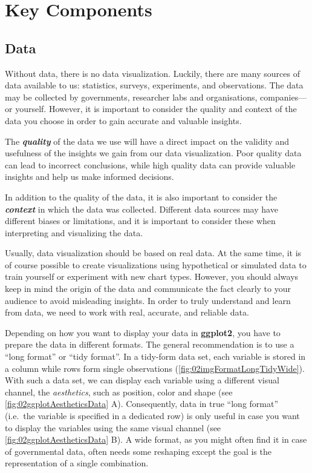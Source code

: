 \documentclass[
]{krantz}
\begin{document}
\hypertarget{key-components}{%
\section{Key Components}\label{key-components}}

\hypertarget{data}{%
\subsection{Data}\label{data}}

Without data, there is no data visualization. Luckily, there are many sources of data available to us: statistics, surveys, experiments, and observations. The data may be collected by governments, researcher labs and organisations, companies---or yourself. However, it is important to consider the quality and context of the data you choose in order to gain accurate and valuable insights.

The \textbf{\emph{quality}} of the data we use will have a direct impact on the validity and usefulness of the insights we gain from our data visualization. Poor quality data can lead to incorrect conclusions, while high quality data can provide valuable insights and help us make informed decisions.

In addition to the quality of the data, it is also important to consider the \textbf{\emph{context}} in which the data was collected. Different data sources may have different biases or limitations, and it is important to consider these when interpreting and visualizing the data.

Usually, data visualization should be based on real data. At the same time, it is of course possible to create visualizations using hypothetical or simulated data to train yourself or experiment with new chart types. However, you should always keep in mind the origin of the data and communicate the fact clearly to your audience to avoid misleading insights. In order to truly understand and learn from data, we need to work with real, accurate, and reliable data.

Depending on how you want to display your data in \textbf{ggplot2}, you have to prepare the data in different formats. The general recommendation is to use a ``long format'' or ``tidy format''. In a tidy-form data set, each variable is stored in a column while rows form single observations (\ref{fig:02imgFormatLongTidyWide}). With such a data set, we can display each variable using a different visual channel, the \emph{aesthetics}, such as position, color and shape (see \ref{fig:02ggplotAestheticsData} A). Consequently, data in true ``long format'' (i.e.~the variable is specified in a dedicated row) is only useful in case you want to display the variables using the same visual channel (see \ref{fig:02ggplotAestheticsData} B). A wide format, as you might often find it in case of governmental data, often needs some reshaping except the goal is the representation of a single combination.
\end{document}
